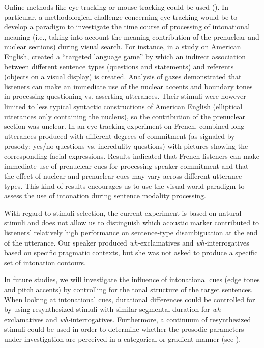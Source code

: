 \documentclass[output=paper]{langsci/langscibook}
\begin{document}
Online methods like eye-tracking or mouse tracking could be used (\citealt{Marslen-Wilson1992,Pynte1996,Tomlinson2011,Warren2014}). In particular, a methodological challenge concerning eye-tracking would be to develop a paradigm to investigate the time course of processing of intonational meaning (i.e., taking into account the meaning contribution of the prenuclear and nuclear sections) during visual search. For instance, in a study on American English, \citet{Heeren.2015} created a “targeted language game” by which an indirect association between different sentence types (questions and statements) and referents (objects on a visual display) is created. Analysis of gazes demonstrated that listeners can make an immediate use of the nuclear accents and boundary tones in processing questioning vs. asserting utterances. Their stimuli were however limited to less typical syntactic constructions of American English (elliptical utterances only containing the nucleus), so the contribution of the prenuclear section was unclear. In an eye-tracking experiment on French, \citet{petroneETAL2016} combined long utterances produced with different degrees of commitment (as signaled by prosody: yes/no questions vs. incredulity questions) with pictures showing the corresponding facial expressions. Results indicated that French listeners can make immediate use of prenuclear cues for processing speaker commitment and that the effect of nuclear and prenuclear cues may vary across different utterance types. This kind of results encourages us to use the visual world paradigm to assess the use of intonation during sentence modality processing.

With regard to stimuli selection, the current experiment is based on natural stimuli and does not allow us to distinguish which acoustic marker contributed to listeners’ relatively high performance on sentence-type disambiguation at the end of the utterance. Our speaker produced \textit{wh-}ex\-cla\-ma\-tives and \textit{wh-}in\-ter\-ro\-ga\-tives based on specific pragmatic contexts, but she was not asked to produce a specific set of intonation contours. 

In future studies, we will investigate the influence of intonational cues (edge tones and pitch accents) by controlling for the tonal structure of the target sentences. When looking at intonational cues, durational differences could be controlled for by using resynthesized stimuli with similar segmental duration for \textit{wh-}exclamatives and \textit{wh-}interrogatives. Furthermore, a continuum of resynthesized stimuli could be used in order to determine whether the prosodic parameters under investigation are perceived in a categorical or gradient manner (see \citealt{Niebuhr2007}). 
\end{document}
